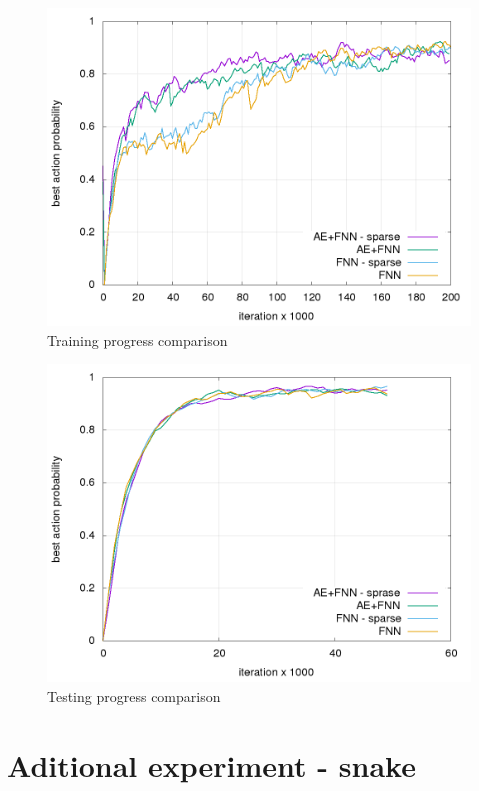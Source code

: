 \documentclass[10pt,a4paper]{article}
\begin{document}
\begin{figure}[!h]
  \centering
  \includegraphics[scale=0.4]{../../results/rl_arcade/training_progress.png}
  \caption{Training progress comparison}
  \label{img:Training progress comparison}
\end{figure}


\begin{figure}[!h]
  \centering
  \includegraphics[scale=0.4]{../../results/rl_arcade/testing_progress.png}
  \caption{Testing progress comparison}
  \label{img:Testing progress comparison}
\end{figure}

\newpage
\section{Aditional experiment - snake}
\end{document}

